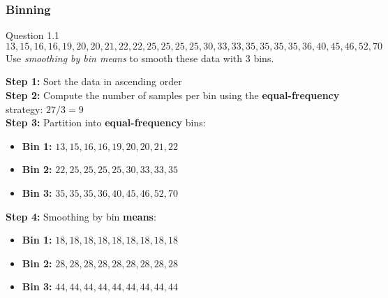 \documentclass[aspectratio=169, 10pt]{beamer}
\begin{document}
\begin{frame}[t]
    \frametitle{Binning}
    \small

    \begin{block}{Question 1.1}
        \[13,15,16,16,19,20,20,21,22,22,25,25,25,25,30,33,33,35,35,35,35,36,40,45,46,52,70\]
        Use \textit{smoothing by bin means} to smooth these data with 3 bins.
    \end{block}
    \textbf{Step 1:} Sort the data in ascending order \\
    \textbf{Step 2:} Compute the number of samples per bin using the \textbf{equal-frequency} strategy: $27/3=9$\\
    \textbf{Step 3:} Partition into \textbf{equal-frequency} bins:

    \begin{itemize}
        \item \textbf{Bin 1:} $13,15,16,16,19,20,20,21,22$
        \item \textbf{Bin 2:} $22,25,25,25,25,30,33,33,35$
        \item \textbf{Bin 3:} $35,35,35,36,40,45,46,52,70$
    \end{itemize}

    \textbf{Step 4:} Smoothing by bin \textbf{means}:

    \begin{itemize}
        \item \textbf{Bin 1:} $18, 18, 18, 18, 18, 18, 18, 18, 18$
        \item \textbf{Bin 2:} $28, 28, 28, 28, 28, 28, 28, 28, 28$
        \item \textbf{Bin 3:} $44, 44, 44, 44, 44, 44, 44, 44, 44$
    \end{itemize}
\end{frame}
\end{document}

